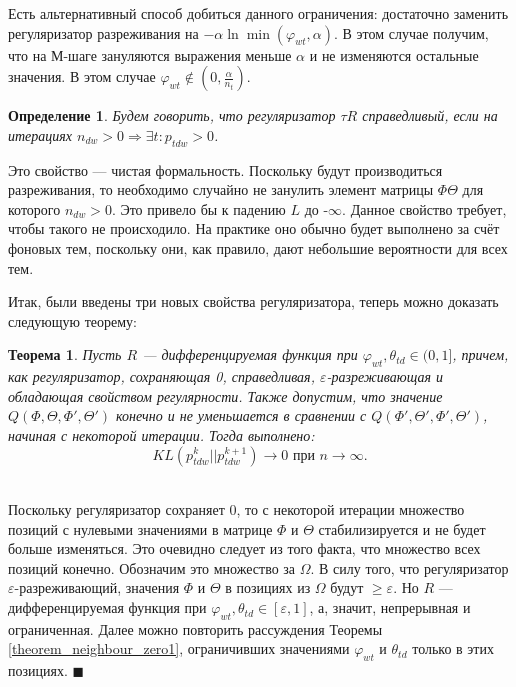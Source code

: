 \documentclass[12pt]{article}
\newtheorem{definition}{Определение}[section]
\newtheorem{theorem}{Теорема}
\newenvironment{Proof} 
	{\par\noindent{\bf Доказательство.}} 
	{\hfill$\blacksquare$}
\renewcommand{\geq}{\geqslant}
\renewcommand{\phi}{\varphi}
\begin{document}
Есть альтернативный способ добиться данного ограничения: достаточно заменить регуляризатор разреживания на $-\alpha \ln \min(\phi_{wt}, \alpha)$. В этом случае получим, что на М-шаге зануляются выражения меньше $\alpha$ и не изменяются остальные значения. В этом случае $\phi_{wt}\notin (0, \frac{\alpha}{n_t})$.
\begin{definition}
\label{fairreg}
Будем говорить, что регуляризатор $\tau R$ справедливый, если на итерациях $n_{dw} > 0 \Rightarrow \exists t\colon p_{tdw} > 0$.
\end{definition}

Это свойство --- чистая формальность. Поскольку будут производиться разреживания, то необходимо случайно не занулить элемент матрицы $\Phi \Theta$ для которого $n_{dw} > 0$. Это привело бы к падению $L$ до -$\infty$.  Данное свойство требует, чтобы такого не происходило. На практике оно обычно будет выполнено за счёт фоновых тем\cite{artmdef2}, поскольку они, как правило, дают небольшие вероятности для всех тем.

Итак, были введены три новых свойства регуляризатора, теперь можно доказать следующую теорему:

\begin{theorem} \label{theorem_neighbour_zero2} Пусть $R$ --- дифференцируемая функция при $\phi_{wt}, \theta_{td} \in (0, 1]$, причем, как регуляризатор, сохраняющая 0, справедливая, $\varepsilon$-разреживающая и обладающая свойством регулярности. Также допустим,  что значение $Q(\Phi, \Theta, \Phi', \Theta')$ конечно и не уменьшается в сравнении с $Q(\Phi', \Theta', \Phi', \Theta')$, начиная с некоторой итерации. Тогда выполнено:
\[
KL(p_{tdw}^{k}||p_{tdw}^{k+1}) \to 0 \text{ при } n \to \infty.
\]
\end{theorem}
\begin{Proof}\ \\
Поскольку регуляризатор сохраняет 0, то с некоторой итерации множество позиций с нулевыми значениями в матрице $\Phi$ и $\Theta$ стабилизируется и не будет больше изменяться. Это очевидно следует из того факта, что  множество всех позиций конечно. Обозначим это множество за $\Omega$. В силу того, что регуляризатор $\varepsilon$-разреживающий, значения $\Phi$ и $\Theta$ в позициях из $\Omega$ будут $\geq \varepsilon$. Но $R$ --- дифференцируемая функция при $\phi_{wt}, \theta_{td} \in [\varepsilon, 1]$, а, значит, непрерывная и ограниченная. Далее можно повторить рассуждения Теоремы \ref{theorem_neighbour_zero1}, ограничивших значениями $\phi_{wt}$ и $\theta_{td}$ только в этих позициях. 
\end{Proof}
\end{document}
